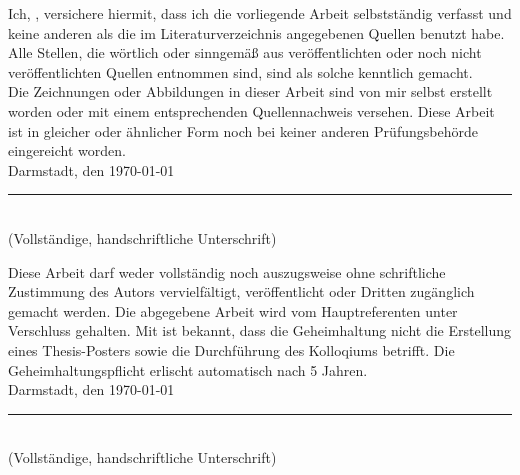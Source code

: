 \documentclass[
11pt, %
english,
singlespacing, %
headsepline, %
]{MastersDoctoralThesis} %
\begin{document}

\begin{declaration}
\addchaptertocentry{\authorshipname} %
\noindent Ich, \authorname, versichere hiermit, dass ich die vorliegende Arbeit selbstständig verfasst und keine anderen als die im Literaturverzeichnis angegebenen Quellen benutzt habe. \\ 

\noindent Alle Stellen, die wörtlich oder sinngemäß aus veröffentlichten oder noch nicht veröffentlichten Quellen entnommen sind, sind als solche kenntlich gemacht.\\

\noindent Die Zeichnungen oder Abbildungen in dieser Arbeit sind von mir selbst erstellt worden oder mit einem entsprechenden Quellennachweis versehen. Diese Arbeit ist in gleicher oder ähnlicher Form noch bei keiner anderen Prüfungsbehörde eingereicht worden.\\

\noindent Darmstadt, den \today

\vspace{5em}
\noindent\rule[1em]{25em}{0.5pt}\\ %
(Vollständige, handschriftliche Unterschrift)

\end{declaration}



\begin{geheimhaltung}
\addchaptertocentry{\confidentialityname} %
\noindent Diese Arbeit darf weder vollständig noch auszugsweise ohne schriftliche Zustimmung des Autors vervielfältigt, veröffentlicht oder Dritten zugänglich gemacht werden. Die abgegebene Arbeit wird vom Hauptreferenten unter Verschluss gehalten. Mit ist bekannt, dass die Geheimhaltung nicht die Erstellung eines Thesis-Posters sowie die Durchführung des Kolloqiums betrifft. Die Geheimhaltungspflicht erlischt automatisch nach 5 Jahren.\\

\noindent Darmstadt, den \today

\vspace{5em}
\noindent\rule[1em]{25em}{0.5pt}\\ %
(Vollständige, handschriftliche Unterschrift)
\clearpage
\end{geheimhaltung}
\end{document}
